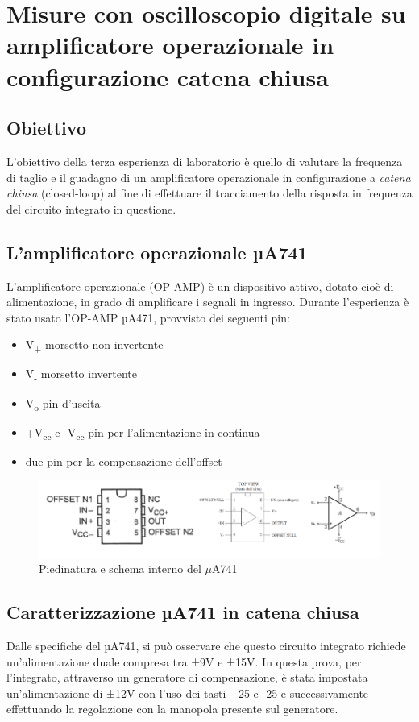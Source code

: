 \chapter{Misure con oscilloscopio digitale su amplificatore operazionale in configurazione catena chiusa}
\label{chap:seconda_prova}

\section*{Obiettivo}
L'obiettivo della terza esperienza di laboratorio è quello di valutare la frequenza di taglio e il guadagno di un amplificatore operazionale in configurazione a \emph{catena chiusa} (closed-loop) al fine di effettuare il tracciamento della risposta in frequenza del circuito integrato in questione.

\section{L'amplificatore operazionale µA741}
L'amplificatore operazionale (OP-AMP) è un dispositivo attivo, dotato cioè di alimentazione, in grado  di amplificare i segnali in ingresso. Durante l'esperienza è stato usato l'OP-AMP µA471, provvisto dei seguenti pin:
\begin{itemize}
    \item V\textsubscript{+} morsetto non invertente
    \item V\textsubscript{-} morsetto invertente
    \item V\textsubscript{o} pin d'uscita
    \item +V\textsubscript{cc} e -V\textsubscript{cc} pin per l'alimentazione in continua
    \item due pin per la compensazione dell'offset
\end{itemize}

\begin{figure}
    \centering
    \includegraphics[width=1\linewidth]{Relazione//media/uA741.png}
    \caption{Piedinatura e schema interno del $\mu$A741}
    \label{fig:Piedinatura e schema interno del uA741}
\end{figure}
\FloatBarrier
\section{Caratterizzazione µA741 in catena chiusa}
Dalle specifiche del µA741, si può osservare che questo circuito integrato richiede un’alimentazione duale compresa tra ±9V e ±15V. In questa prova, per l'integrato, attraverso un generatore di compensazione, è stata impostata un'alimentazione di ±12V con l'uso dei tasti +25 e -25 e successivamente effettuando la regolazione con la manopola presente sul generatore.


